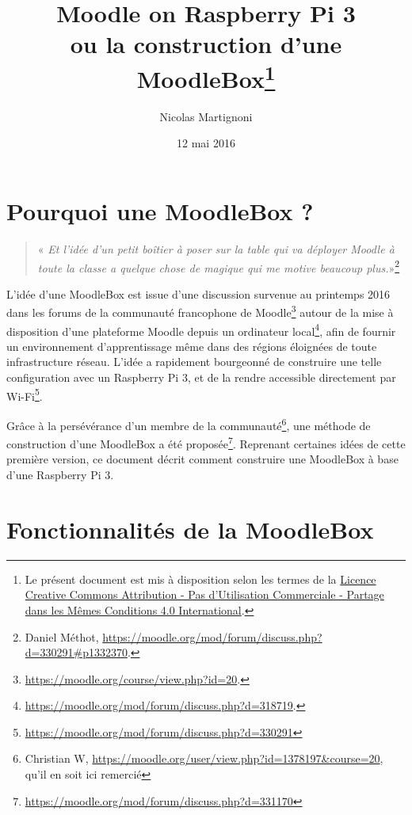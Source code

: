 \documentclass[11pt]{article}
\begin{document}
\title{Moodle on Raspberry Pi 3\\ ou la construction d'une MoodleBox\footnote{Le présent document est mis à disposition selon les termes de la \href{http://creativecommons.org/licenses/by-nc-sa/4.0/}{Licence Creative Commons Attribution - Pas d'Utilisation Commerciale - Partage dans les Mêmes Conditions 4.0 International}.}}
\date{12 mai 2016}
\author{Nicolas Martignoni}
\maketitle

\begingroup
\setlength{\parskip}{0pt}
\tableofcontents
\endgroup

\section{Pourquoi une MoodleBox ?}

\begin{quote}
\noindent « \emph{Et l'idée d'un petit boîtier à poser sur la table qui va déployer Moodle à toute la classe a quelque chose de magique qui me motive beaucoup plus.}»\footnote{Daniel Méthot, \url{https://moodle.org/mod/forum/discuss.php?d=330291\#p1332370}.}
\end{quote}

L'idée d'une MoodleBox est issue d'une discussion survenue au printemps 2016 dans les forums de la communauté francophone de Moodle\footnote{\url{https://moodle.org/course/view.php?id=20}.} autour de la mise à disposition d'une plateforme Moodle depuis un ordinateur local\footnote{\url{https://moodle.org/mod/forum/discuss.php?d=318719}.}, afin de fournir un environnement d'apprentissage même dans des régions éloignées de toute infrastructure réseau. L'idée a rapidement bourgeonné de construire une telle configuration avec un Raspberry Pi 3, et de la rendre accessible directement par Wi-Fi\footnote{\url{https://moodle.org/mod/forum/discuss.php?d=330291}}.

Grâce à la persévérance d'un membre de la communauté\footnote{Christian W, \url{https://moodle.org/user/view.php?id=1378197&course=20}, qu'il en soit ici remercié}, une méthode de construction d'une MoodleBox a été proposée\footnote{\url{https://moodle.org/mod/forum/discuss.php?d=331170}}. Reprenant certaines idées de cette première version, ce document décrit comment construire une MoodleBox à base d'une Raspberry Pi 3.

\section{Fonctionnalités de la MoodleBox}
\end{document}
